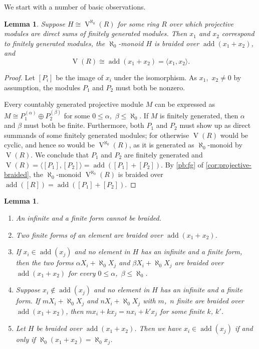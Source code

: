 \documentclass[a4paper,11pt,oneside]{amsart}
\newtheorem{lemma}[teor]{Lemma}
\theoremstyle{remark}
\DeclareMathOperator{\add}{add}
\DeclareMathOperator{\Vmon}{V}
\begin{document}
We start with a number of basic observations.

\begin{lemma} \label{l:twogen-braided}
  Suppose $H \cong \Vmon^{\aleph_0}(R)$ for some ring $R$ over which projective modules are direct sums of finitely generated modules.
  Then $x_1$ and $x_2$ correspond to finitely generated modules, the $\aleph_0$-monoid $H$ is braided over $\add(x_1+x_2)$, and
  \[
    \Vmon(R) \cong \add(x_1+x_2)=\langle x_1,x_2 \rangle.
  \]
\end{lemma}

\begin{proof}
  Let $[P_i]$ be the image of $x_i$ under the isomorphism.
  As $x_1$,~$x_2 \ne 0$ by assumption, the modules $P_1$ and $P_2$ must both be nonzero.
  
  Every countably generated projective module $M$ can be expressed as $M \cong P_1^{(\alpha)} \oplus P_2^{(\beta)}$ for some $0 \le \alpha$,~$\beta \le \aleph_0$.
  If $M$ is finitely generated, then $\alpha$ and $\beta$ must both be finite.
  Furthermore, both $P_1$ and $P_2$ must show up as direct summands of some finitely generated modules; for otherwise $\Vmon(R)$ would be cyclic, and hence so would be $\Vmon^{\aleph_0}(R)$, as it is generated as $\aleph_0$-monoid by $\Vmon(R)$.
  We conclude that $P_1$ and $P_2$ are finitely generated and $\Vmon(R) = \big\langle [P_1], [P_2] \big\rangle = \add([P_1]+[P_2])$.
  By \ref{pb:fg} of \cref{cor:projective-braided}, the $\aleph_0$-monoid $\Vmon^{\aleph_0}(R)$ is braided over $\add([R])=\add([P_1]+[P_2])$.
\end{proof}


\begin{lemma} \label{easyfactlemma1} \mbox{}
\begin{enumerate}
  \item\label{efl1:inf-fin} An infinite and a finite form cannot be braided.
  \item\label{efl1:fin} Two finite forms of an element are braided over $\add(x_1 + x_2)$.
  \item\label{efl1:add-inclusion} If $x_i \in \add(x_j)$ and no element in $H$ has an infinite and a finite form, then the two forms  $\alpha X_i + \aleph_0 X_j$ and $\beta X_i + \aleph_0 X_j$ are braided over $\add(x_1 + x_2)$ for every $0 \le \alpha$,~$\beta \le \aleph_0$.
  \item\label{efl1:add-incomparable} Suppose $x_i \not\in \add(x_j)$ and no element in $H$ has an infinite and a finite form.
    If $m X_i + \aleph_0 X_j$ and $n X_i + \aleph_0 X_j$ with $m$,~$n$ finite are braided over $\add(x_1+x_2)$, then $m x_i + k x_j = n x_i + k' x_j$ for some finite $k$, $k'$.
  \item\label{efl1:add-inclusion-iff} Let $H$ be braided over $\add (x_1 + x_2)$.
    Then we have $x_i \in \add(x_j)$ if and only if $\aleph_0 (x_1 + x_2)  = \aleph_0 x_j$. 
\end{enumerate}
\end{lemma}
\end{document}
